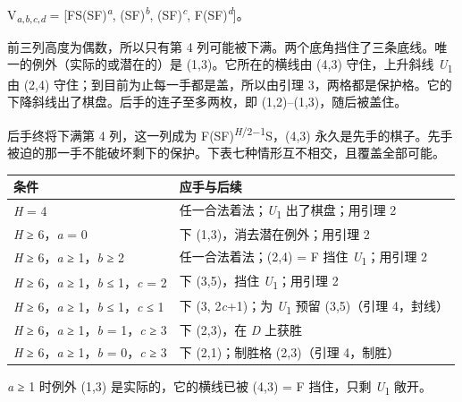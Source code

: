 \documentclass[
  a4paper,
]{article}
\newcounter{none} %
\begin{document}
V\textsubscript{\emph{a},\emph{b},\emph{c},\emph{d}} =
{[}FS(SF)\textsuperscript{\emph{a}}, (SF)\textsuperscript{\emph{b}},
(SF)\textsuperscript{\emph{c}}, F(SF)\textsuperscript{\emph{d}}{]}。

前三列高度为偶数，所以只有第 4
列可能被下满。两个底角挡住了三条底线。唯一的例外（实际的或潜在的）是
(1,3)。它所在的横线由 (4,3) 守住，上升斜线 \emph{U}\textsubscript{1} 由
(2,4) 守住；到目前为止每一手都是盖，所以由引理
3，两格都是保护格。它的下降斜线出了棋盘。后手的连子至多两枚，即
(1,2)--(1,3)，随后被盖住。

后手终将下满第 4 列，这一列成为
F(SF)\textsuperscript{\emph{H}/2−1}S，(4,3)
永久是先手的棋子。先手被迫的那一手不能破坏剩下的保护。下表七种情形互不相交，且覆盖全部可能。

{\def\LTcaptype{none} %
\begin{longtable}[]{@{}
  >{\raggedright\arraybackslash}p{}
  >{\raggedright\arraybackslash}p{}@{}}
\toprule\noalign{}
\begin{minipage}[b]{\linewidth}\raggedright
条件
\end{minipage} & \begin{minipage}[b]{\linewidth}\raggedright
应手与后续
\end{minipage} \\
\midrule\noalign{}
\endhead
\bottomrule\noalign{}
\endlastfoot
\emph{H} = 4 & 任一合法着法；\emph{U}\textsubscript{1} 出了棋盘；用引理
2 \\
\emph{H} ≥ 6，\emph{a} = 0 & 下 (1,3)，消去潜在例外；用引理 2 \\
\emph{H} ≥ 6，\emph{a} ≥ 1，\emph{b} ≥ 2 & 任一合法着法；(2,4) = F 挡住
\emph{U}\textsubscript{1}；用引理 2 \\
\emph{H} ≥ 6，\emph{a} ≥ 1，\emph{b} ≤ 1，\emph{c} = 2 & 下 (3,5)，挡住
\emph{U}\textsubscript{1}；用引理 2 \\
\emph{H} ≥ 6，\emph{a} ≥ 1，\emph{b} ≤ 1，\emph{c} ≤ 1 & 下 (3,
2\emph{c}+1)；为 \emph{U}\textsubscript{1} 预留 (3,5)（引理 4，封线） \\
\emph{H} ≥ 6，\emph{a} ≥ 1，\emph{b} = 1，\emph{c} ≥ 3 & 下 (2,3)，在
\emph{D} 上获胜 \\
\emph{H} ≥ 6，\emph{a} ≥ 1，\emph{b} = 0，\emph{c} ≥ 3 & 下
(2,1)；制胜格 (2,3)（引理 4，制胜） \\
\end{longtable}
}

\emph{a} ≥ 1 时例外 (1,3) 是实际的，它的横线已被 (4,3) = F 挡住，只剩
\emph{U}\textsubscript{1} 敞开。
\end{document}
